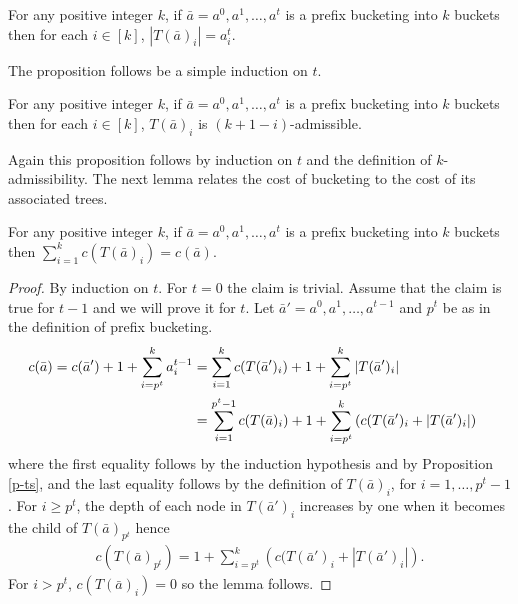 \documentclass[runningheads,a4paper]{llncs}
\begin{document}
\begin{proposition}\label{p-ts}
For any positive integer $k$, if $\bar{a} = a^0,a^1,\dots,a^t$ is a prefix bucketing into $k$ buckets
then for each $i\in [k]$, $|T(\bar{a})_i| = a^t_i$.
\end{proposition}

The proposition follows be a simple induction on $t$.

\begin{proposition}\label{p-ta}
For any positive integer $k$, if $\bar{a} = a^0,a^1,\dots,a^t$ is a prefix bucketing into $k$ buckets then
for each $i\in [k]$, $T(\bar{a})_i$ is $(k+1-i)$-admissible.
\end{proposition}

Again this proposition follows by induction on $t$ and the definition of $k$-admissibility. The next lemma relates
the cost of bucketing to the cost of its associated trees.

\begin{lemma}\label{l-tc}
For any positive integer $k$, if $\bar{a} = a^0,a^1,\dots,a^t$ is a prefix bucketing into $k$ buckets then
 $\sum_{i=1}^k c(T(\bar{a})_i) = c(\bar{a})$.
\end{lemma}

\begin{proof}
By induction on $t$. For $t=0$ the claim is trivial. Assume that the claim is true for $t-1$ and we will prove it for $t$.
Let $\bar{a}'=a^0,a^1,\dots,a^{t-1}$ and $p^t$ be as in the definition of prefix bucketing.
\begin{align*}
c(\bar{a}) = c(\bar{a}') + 1 + \sum_{i=p^t}^k a^{t-1}_i 
&= \sum_{i=1}^k c(T(\bar{a}')_i) + 1 + \sum_{i=p^t}^k |T(\bar{a}')_i| \cr
&= \sum_{i=1}^{p^t-1} c(T(\bar{a})_i) + 1 + \sum_{i=p^t}^k \left(c(T(\bar{a}')_i + |T(\bar{a}')_i|\right) 
\end{align*}
where the first equality follows by the induction hypothesis and by Proposition \ref{p-ts}, and the last equality follows
by the definition of $T(\bar{a})_i$, for $i=1,\dots,p^t-1$.
For $i\ge p^t$, the depth of each node in $T(\bar{a}')_i$ increases by one when it becomes the child of $T(\bar{a})_{p^t}$ hence
\begin{align*}
c(T(\bar{a})_{p^t}) =  1 + \sum_{i=p^t}^k \left(c(T(\bar{a}')_i + |T(\bar{a}')_i|\right).
\end{align*}
For $i > p^t$, $c(T(\bar{a})_i) = 0$ so the lemma follows.
\end{proof}
\end{document}
